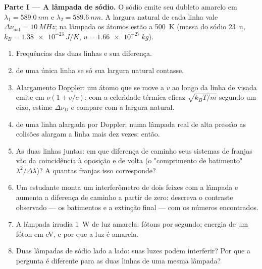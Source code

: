 \begin{problem}
\label{pb:b2:scalar-light-model:1}

\medskip
\noindent\textbf{Parte I --- A lâmpada de sódio.}
O sódio emite seu dubleto amarelo em $\lambda_1 = \qty{589.0}{nm}$ e $\lambda_2 =
\qty{589.6}{nm}$. A largura natural de cada linha vale $\Delta\nu_{\text{nat}} =
\qty{10}{MHz}$; na lâmpada os átomos estão a \qty{500}{K} (massa do sódio
\qty{23}{u}, $k_B = \qty{1.38e-23}{J/K}$, $u = \qty{1.66e-27}{kg}$).
\begin{enumerate}
  \item Frequências das duas linhas e sua diferença.
  \item {} de uma única linha se só sua largura natural
        contasse.
  \item Alargamento Doppler: um átomo que se move a $v$ ao longo da linha de
        visada emite em $\nu(1 + v/c)$; com a celeridade térmica eficaz $\sqrt{k_BT
        /m}$ segundo um eixo, estime $\Delta\nu_D$ e compare com a
        largura natural.
  \item {} de uma linha alargada por Doppler; numa lâmpada
        real de alta pressão as colisões alargam a linha mais dez
        vezes:  então.
  \item As duas linhas juntas: em que diferença de caminho seus sistemas
        de franjas vão da coincidência à oposição e de volta
        (o "comprimento de batimento" $\lambda^2/\Delta\lambda$)? A quantas franjas isso corresponde?
  \item Um estudante monta um interferômetro de dois feixes com a lâmpada e
        aumenta a diferença de caminho a partir de zero: descreva o
        contraste observado --- os batimentos e a extinção final --- com
        os números encontrados.
  \item A lâmpada irradia \qty{1}{W} de luz amarela: fótons por segundo;
        energia de um fóton em eV, e por que a luz é amarela.
  \item Duas lâmpadas de sódio lado a lado: suas luzes podem interferir?
        Por que a pergunta é diferente para as duas linhas de uma mesma lâmpada?
\end{enumerate}


\end{problem}
